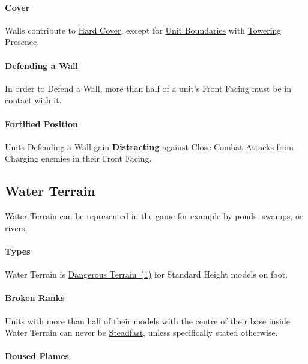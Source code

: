 \paragraph{Cover}

Walls contribute to \hyperref[covering_terrain]{Hard Cover}, except for \hyperref[boundary_rectangle]{Unit Boundaries} with \hyperref[towering_presence]{Towering Presence}.

\paragraph{Defending a Wall}

In order to Defend a Wall, more than half of a unit's Front Facing must be in contact with it.

\paragraph{Fortified Position}

Units Defending a Wall gain \hyperref[distracting]{\textbf{Distracting}} against Close Combat Attacks from Charging enemies in their Front Facing.

\columnbreak

\subsection{Water Terrain}
\label{water_terrain}

Water Terrain can be represented in the game for example by ponds, swamps, or rivers.

\paragraph{Types}

Water Terrain is \hyperref[dangerous_terrain]{Dangerous Terrain~(1)} for Standard Height models on foot.

\paragraph{Broken Ranks}

Units with more than half of their models with the centre of their base inside Water Terrain can never be \hyperref[steadfast]{Steadfast}, unless specifically stated otherwise. 

\paragraph{Doused Flames}

